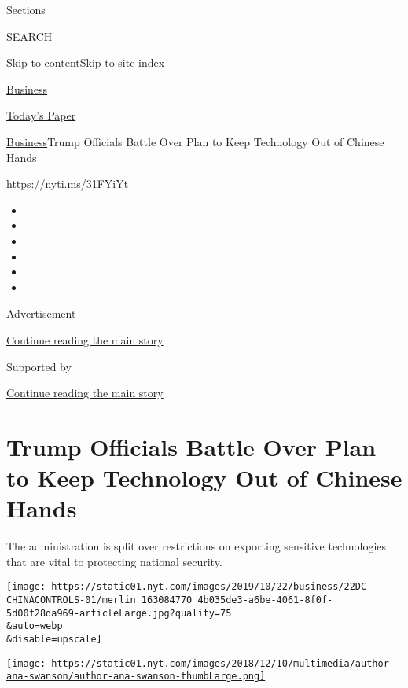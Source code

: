 Sections

SEARCH

\protect\hyperlink{site-content}{Skip to
content}\protect\hyperlink{site-index}{Skip to site index}

\href{https://www.nytimes.com/section/business}{Business}

\href{https://myaccount.nytimes.com/auth/login?response_type=cookie\&client_id=vi}{}

\href{https://www.nytimes.com/section/todayspaper}{Today's Paper}

\href{/section/business}{Business}\textbar{}Trump Officials Battle Over
Plan to Keep Technology Out of Chinese Hands

\url{https://nyti.ms/31FYiYt}

\begin{itemize}
\item
\item
\item
\item
\item
\item
\end{itemize}

Advertisement

\protect\hyperlink{after-top}{Continue reading the main story}

Supported by

\protect\hyperlink{after-sponsor}{Continue reading the main story}

\hypertarget{trump-officials-battle-over-plan-to-keep-technology-out-of-chinese-hands}{%
\section{Trump Officials Battle Over Plan to Keep Technology Out of
Chinese
Hands}\label{trump-officials-battle-over-plan-to-keep-technology-out-of-chinese-hands}}

The administration is split over restrictions on exporting sensitive
technologies that are vital to protecting national security.

\texttt{[image: https://static01.nyt.com/images/2019/10/22/business/22DC-CHINACONTROLS-01/merlin\_163084770\_4b035de3-a6be-4061-8f0f-5d00f28da969-articleLarge.jpg?quality=75\\\&auto=webp\\\&disable=upscale]}

\href{https://www.nytimes.com/by/ana-swanson}{\texttt{[image: https://static01.nyt.com/images/2018/12/10/multimedia/author-ana-swanson/author-ana-swanson-thumbLarge.png]}}

